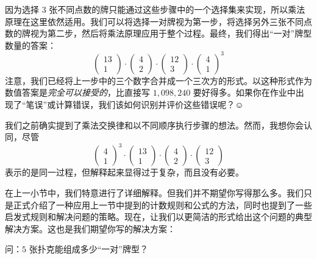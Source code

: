 \begin{example}[一对]
    因为选择 $3$ 张不同点数的牌只能通过这些步骤中的一个选择集来实现，所以乘法原理在这里依然适用。我们可以将选择一对牌视为第一步，将选择另外三张不同点数的牌视为第二步，然后将乘法原理应用于整个过程。最终，我们得出``一对''牌型数量的答案：
    \[\begin{pmatrix}
            13 \\
            1
        \end{pmatrix} \cdot \begin{pmatrix}
            4 \\
            2
        \end{pmatrix} \cdot \begin{pmatrix}
            12 \\
            3
        \end{pmatrix} \cdot \begin{pmatrix}
            4 \\
            1
        \end{pmatrix}^3\]
    注意，我们已经将上一步中的三个数字合并成一个三次方的形式。以这种形式作为数值答案是\emph{完全可以接受的}，比直接写 $1,098,240$ 要好得多。如果你在作业中出现了``笔误''或计算错误，我们该如何识别并评价这些错误呢？$\smiley{}$

    我们之前确实提到了乘法交换律和以不同顺序执行步骤的想法。然而，我想你会认同，尽管
    \[\begin{pmatrix}
            4 \\
            1
        \end{pmatrix}^3 \cdot \begin{pmatrix}
            13 \\
            1
        \end{pmatrix} \cdot \begin{pmatrix}
            4 \\
            2
        \end{pmatrix} \cdot \begin{pmatrix}
            12 \\
            3
        \end{pmatrix}\]
    表示的是同一过程，但解释起来显得过于复杂，而且没有必要。

    在上一小节中，我们特意进行了详细解释。但我们并不期望你写得那么多。我们只是正式介绍了一种应用上一节中提到的计数规则和公式的方法，同时也提到了一些启发式规则和解决问题的策略。现在，让我们以更简洁的形式给出这个问题的典型解决方案。这也是我们期望你写的解决方案：

    \begin{questions}{问}：$5$ 张扑克能组成多少``一对''牌型？\end{questions}


\end{example}
